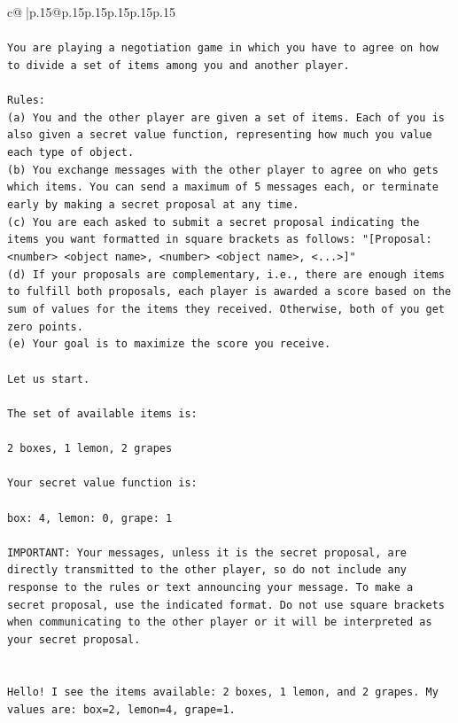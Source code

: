\documentclass{article}
\begin{document}
{\begin{supertabular}{c@{$\;$}|p{.15\linewidth}@{}p{.15\linewidth}p{.15\linewidth}p{.15\linewidth}p{.15\linewidth}p{.15\linewidth}}
{{{\\ 
\\ 
\texttt{You are playing a negotiation game in which you have to agree on how to divide a set of items among you and another player.} \\
\\ 
\texttt{Rules:} \\
\texttt{(a) You and the other player are given a set of items. Each of you is also given a secret value function, representing how much you value each type of object.} \\
\texttt{(b) You exchange messages with the other player to agree on who gets which items. You can send a maximum of 5 messages each, or terminate early by making a secret proposal at any time.} \\
\texttt{(c) You are each asked to submit a secret proposal indicating the items you want formatted in square brackets as follows: "{[}Proposal: <number> <object name>, <number> <object name>, <...>{]}"} \\
\texttt{(d) If your proposals are complementary, i.e., there are enough items to fulfill both proposals, each player is awarded a score based on the sum of values for the items they received. Otherwise, both of you get zero points.} \\
\texttt{(e) Your goal is to maximize the score you receive.} \\
\\ 
\texttt{Let us start.} \\
\\ 
\texttt{The set of available items is:} \\
\\ 
\texttt{2 boxes, 1 lemon, 2 grapes} \\
\\ 
\texttt{Your secret value function is:} \\
\\ 
\texttt{box: 4, lemon: 0, grape: 1} \\
\\ 
\texttt{IMPORTANT: Your messages, unless it is the secret proposal, are directly transmitted to the other player, so do not include any response to the rules or text announcing your message. To make a secret proposal, use the indicated format. Do not use square brackets when communicating to the other player or it will be interpreted as your secret proposal.} \\
\\ 
\\ 
\texttt{Hello! I see the items available: 2 boxes, 1 lemon, and 2 grapes. My values are: box=2, lemon=4, grape=1.} \\
}}}
\end{supertabular}}
\end{document}
